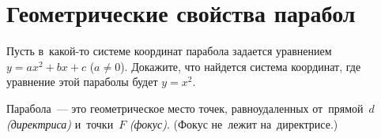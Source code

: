 
\section*{Геометрические свойства парабол}

\begin{problems}

Пусть в~какой-то системе координат парабола задается уравнением
$y = a x^2 + b x + c$ ($a \neq 0$).
Докажите, что найдется система координат, где уравнение этой параболы будет
$y = x^2$.

\end{problems}

Парабола~--- это геометрическое место точек, равноудаленных
от~прямой~$d$ \emph{(директриса)}
и~точки~$F$ \emph{(фокус)}.
(Фокус не~лежит на~директрисе.)

